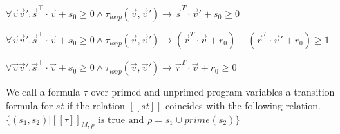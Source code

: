 \documentclass[a4paper]{article}
\begin{document}
\begin{minipage}[t]{0.16\linewidth}
\begin{betterlist}
{{\begin{betterlist}
\begin{betterlist}
\begin{betterlist}
							\item $\forall\vec{v}\vec{v}'.\vec{s}^⊺\cdot \vec{v} + s_0 \geq 0 \land \tau_{loop}(\vec{v},\vec{v}') \rightarrow\vec{s}^T\cdot \vec{v}' + s_0 \geq 0$
							\item $\forall\vec{v}\vec{v}'.\vec{s}^⊺\cdot \vec{v} + s_0 \geq 0 \land \tau_{loop}(\vec{v},\vec{v}') \rightarrow (\vec{r}^T\cdot \vec{v} + r_0) −(\vec{r}^T\cdot \vec{v}'  + r_0) \geq 1$
							\item $\forall\vec{v}\vec{v}'.\vec{s}^⊺\cdot \vec{v} + s_0 \geq 0 \land \tau_{loop}(\vec{v},\vec{v}') \rightarrow\vec{r}^T\cdot \vec{v} + r_0 \geq 0$
						\end{betterlist}
					\end{betterlist}
					\item We call a formula $\tau$ over primed and unprimed program variables a \alert{transition formula} for $st$ if the relation $[[st]]$ coincides with the following relation. $\{(s_1, s_2) | [[\tau]]_{M,\rho} \text{ is true and } \rho = s_1 \cup prime(s_2)\}$


\end{betterlist}}}
\end{betterlist}
\end{minipage}
\end{document}

